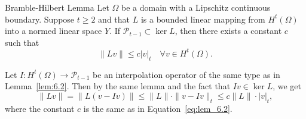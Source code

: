 \begin{lem}{Bramble-Hilbert Lemma}
    Let $\Omega$ be a domain with a Lipschitz continuous boundary. Suppose $t\geq 2$ and that $L$ is a bounded linear mapping from $H^t(\Omega)$ into a normed linear space $Y$.
    If $\mathcal{P}_{t-1}\subset \ker L$, then there exists a constant $c$ such that~\label{lem:Bramble-Hilbert}
    \begin{equation}
        \|Lv\|\leq c|v|_t\quad \forall v\in H^t(\Omega).
    \end{equation}
\end{lem}
\begin{bev}
    Let $I:H^t(\Omega)\rightarrow \mathcal{P}_{t-1}$ be an interpolation operator of the same type as in Lemma~\ref{lem:6.2}.
     Then by the same lemma and the fact that $Iv\in\ker L$, we get
    \begin{equation}
        \|Lv\|=\|L(v-Iv)\|\leq \|L\|\cdot\|v-Iv\|_t\leq c\|L\| \cdot |v|_t,
    \end{equation}
    where the constant $c$  is the same as in Equation~\ref{eq:lem_6.2}.~\label{lem:6.3}
\end{bev}